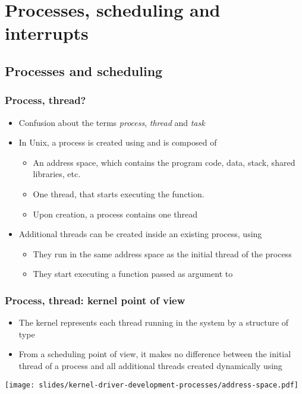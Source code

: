 \section{Processes, scheduling and interrupts}

\subsection{Processes and scheduling}

\begin{frame}
  \frametitle{Process, thread?}
  \begin{itemize}
  \item Confusion about the terms \emph{process}, \emph{thread} and
    \emph{task}
  \item In Unix, a process is created using  and is
    composed of
    \begin{itemize}
    \item An address space, which contains the program code, data,
      stack, shared libraries, etc.
    \item One thread, that starts executing the 
      function.
    \item Upon creation, a process contains one thread
    \end{itemize}
  \item Additional threads can be created inside an existing process,
    using 
    \begin{itemize}
    \item They run in the same address space as the initial thread of
      the process
    \item They start executing a function passed as argument to
    \end{itemize}
  \end{itemize}
\end{frame}

\begin{frame}
  \frametitle{Process, thread: kernel point of view}
  \begin{itemize}
  \item The kernel represents each thread running in the system by a
    structure of type 
  \item From a scheduling point of view, it makes no difference
    between the initial thread of a process and all additional threads
    created dynamically using 
  \end{itemize}
  \begin{center}
    \texttt{[image: slides/kernel-driver-development-processes/address-space.pdf]}
  \end{center}
\end{frame}

